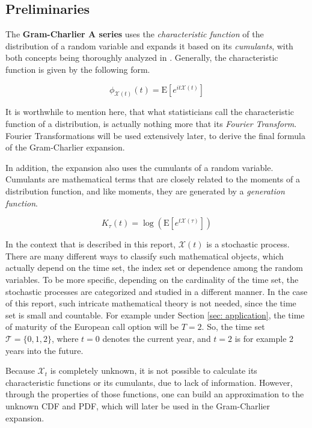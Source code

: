 \subsection{Preliminaries}
The \textbf{Gram-Charlier A series} uses the \textit{characteristic function} of the distribution of a random variable and expands it based on its \textit{cumulants}, with both concepts being thoroughly analyzed in \cite{blitzstein2019introduction}. Generally, the characteristic function is given by the following form.

\[
\phi_{\mathcal{X}(t)} (t) = \text{E}[e^{it \mathcal{X}(t)}]
\]

It is worthwhile to mention here, that what statisticians call the characteristic function of a distribution, is actually nothing more that its \textit{Fourier Transform}. Fourier Transformations will be used extensively later, to derive the final formula of the Gram-Charlier expansion.

In addition, the expansion also uses the cumulants of a random variable. Cumulants are mathematical terms that are closely related to the moments of a distribution function, and like moments, they are generated by a \textit{generation function}.

\[
	K_{\tau}(t) = \log(\text{E}[e^{t \mathcal{X}(\tau)}])
\]

\begin{remark}
	In the context that is described in this report, $\mathcal{X}(t)$ is a stochastic process. There are many different ways to classify such mathematical objects, which actually depend on the time set, the index set or dependence among the random variables. To be more specific, depending on the cardinality of the time set, the stochastic processes are categorized and studied in a different manner. 
	In the case of this report, such intricate mathematical theory is not needed, since the time set is small and countable. For example under Section \ref{sec: application}, the time of maturity of the European call option will be \(T = 2\). So, the time set \(\mathcal{T} = \{0,1,2\} \), where $t=0$ denotes the current year, and $t=2$ is for example 2 years into the future.
\end{remark}

Because $\mathcal{X}_t$ is completely unknown, it is not possible to calculate its characteristic functions or its cumulants, due to lack of information. However, through the properties of those functions, one can build an approximation to the unknown CDF and PDF, which will later be used in the Gram-Charlier expansion.

